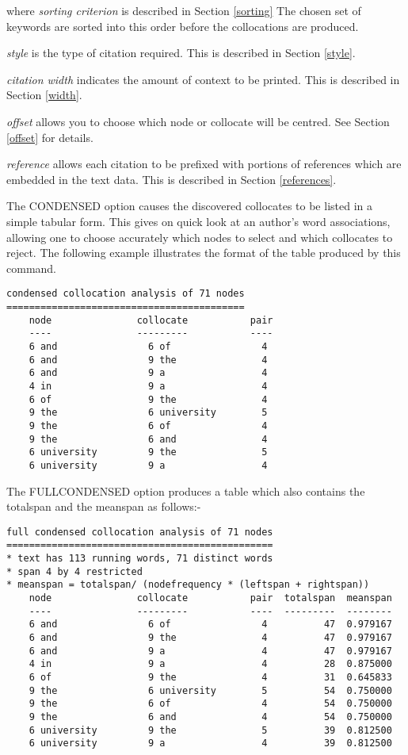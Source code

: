 where {\em sorting criterion} is described in Section \ref{sorting}
The chosen set of keywords are sorted into this order before the
collocations are produced.

{\em style} is the type of citation required.  This is described in Section
\ref{style}.

{\em citation width} indicates the amount of context to be printed.  This
is described in Section \ref{width}.

{\em offset} allows you to choose which node or collocate will be centred.
See Section \ref{offset} for details.

{\em reference} allows each citation to be prefixed with portions of references
which are embedded in the text data.  This is described in Section
\ref{references}.

The CONDENSED option causes the discovered collocates to be listed in
a simple tabular form.  This gives on quick look at an author's word
associations, allowing one to choose accurately which nodes to select
and which collocates to reject.  The following example illustrates
the format of the table produced by this command.
\begin{verbatim}
condensed collocation analysis of 71 nodes
==========================================
    node               collocate           pair
    ----               ---------           ----
    6 and                6 of                4
    6 and                9 the               4
    6 and                9 a                 4
    4 in                 9 a                 4
    6 of                 9 the               4
    9 the                6 university        5
    9 the                6 of                4
    9 the                6 and               4
    6 university         9 the               5
    6 university         9 a                 4
\end{verbatim}

  The FULLCONDENSED option produces a table which also contains
the totalspan and the meanspan as follows:-
\begin{verbatim}
full condensed collocation analysis of 71 nodes
===============================================
* text has 113 running words, 71 distinct words
* span 4 by 4 restricted
* meanspan = totalspan/ (nodefrequency * (leftspan + rightspan))
    node               collocate           pair  totalspan  meanspan
    ----               ---------           ----  ---------  --------
    6 and                6 of                4          47  0.979167
    6 and                9 the               4          47  0.979167
    6 and                9 a                 4          47  0.979167
    4 in                 9 a                 4          28  0.875000
    6 of                 9 the               4          31  0.645833
    9 the                6 university        5          54  0.750000
    9 the                6 of                4          54  0.750000
    9 the                6 and               4          54  0.750000
    6 university         9 the               5          39  0.812500
    6 university         9 a                 4          39  0.812500
\end{verbatim}

